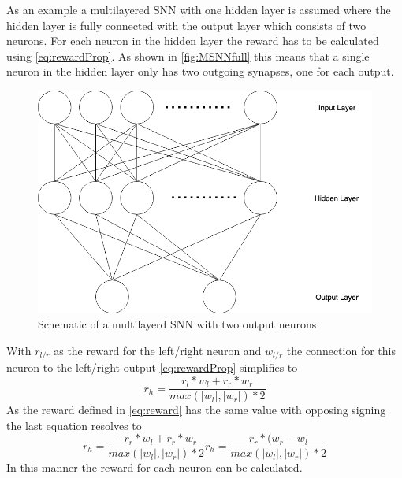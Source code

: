 As an example a multilayered SNN with one hidden layer is assumed where the hidden layer is fully connected with the output layer which consists of two neurons. For each neuron in the hidden layer the reward has to be calculated using \autoref{eq:rewardProp}. As shown in \autoref{fig:MSNNfull} this means that a single neuron in the hidden layer only has two outgoing synapses, one for each output.

\begin{figure}[htpb]
  \centering
  \includegraphics[width=\textwidth]{figures/MSNNfu.png}
  \caption{Schematic of a multilayerd SNN with two output neurons}
  \label{fig:MSNNfull}
\end{figure}
With $r_{l/r}$ as the reward for the left/right neuron and $w_{l/r}$ the connection for this neuron to the left/right output \autoref{eq:rewardProp} simplifies to
\begin{equation}
r_h = \frac{ r_l * w_l + r_r * w_r} {max(|w_l|,|w_r|)*2}
\end{equation}
As the reward defined in \autoref{eq:reward} has the same value with opposing signing the last equation resolves to
\begin{equation}\label{eq:rewardPSimp}
r_h = \frac{ -r_r * w_l + r_r * w_r} {max(|w_l|,|w_r|)*2}
r_h = \frac{ r_r *(w_r-w_l } {max(|w_l|,|w_r|)*2}
\end{equation}
In this manner the reward for each neuron can be calculated.
